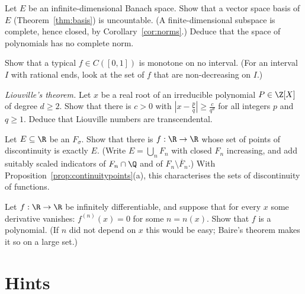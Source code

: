\begin{exercise}[$\star\star$]\label{ex:hamelbanach}
Let $E$ be an infinite-dimensional Banach space. Show that a vector space basis of $E$ (Theorem~\ref{thm:basis}) is uncountable. (A finite-dimensional subspace
is complete, hence closed, by Corollary~\ref{cor:norms}.) Deduce that the space of polynomials has no complete norm.
\end{exercise}

\begin{exercise}[$\star\star$]\label{ex:monotone2}
Show that a typical $f\in C([0,1])$ is monotone on no interval. (For an interval $I$ with rational ends, look at the set of $f$ that are non-decreasing on $I$.)
\end{exercise}

\begin{exercise}[$\star\star$]\label{ex:liouville}
\emph{Liouville's theorem.} Let $x$ be a real root of an irreducible polynomial $P\in\Z[X]$ of degree $d\ge2$. Show that there is $c>0$ with $|x-\frac pq|\ge\frac c{q^d}$ for all integers $p$ and
$q\ge1$. Deduce that Liouville numbers are transcendental.
\end{exercise}

\begin{exercise}[$\star\star$]\label{ex:fsigma}
Let $E\subseteq\R$ be an $F_\sigma$. Show that there is $f:\R\to\R$ whose set of points of discontinuity is exactly $E$. (Write $E=\bigcup_nF_n$ with closed $F_n$ increasing, and add
suitably scaled indicators of $F_n\cap\Q$ and of $F_n\setminus\mathring{F_n}$.) With Proposition~\ref{prop:continuitypoints}(a), this characterises the sets of discontinuity of functions.
\end{exercise}

\begin{exercise}[$\star\star\star$]\label{ex:polynomial}
Let $f:\R\to\R$ be infinitely differentiable, and suppose that for every $x$ some derivative vanishes: $f^{(n)}(x)=0$ for some $n=n(x)$. Show that $f$ is a polynomial. (If $n$
did not depend on $x$ this would be easy; Baire's theorem makes it so on a large set.)
\end{exercise}

\section{Hints}

